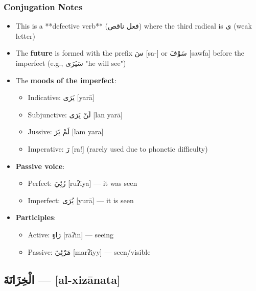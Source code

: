 \documentclass[letterpaper,12pt]{article}
\begin{document}
\subsubsection*{Conjugation Notes}
\begin{itemize}
  \item This is a **defective verb** (\textarabic{فعل ناقص}) where the third radical is \textarabic{ى} (weak letter)
  \item The \textbf{future} is formed with the prefix \textarabic{سَ} [sa-] or \textarabic{سَوْفَ} [sawfa] before the imperfect (e.g., \textarabic{سَيَرَى} "he will see")
  \item The \textbf{moods of the imperfect}: 
    \begin{itemize}
      \item Indicative: \textarabic{يَرَى} [yarā] 
      \item Subjunctive: \textarabic{لَنْ يَرَى} [lan yarā]
      \item Jussive: \textarabic{لَمْ يَرَ} [lam yara]
      \item Imperative: \textarabic{رَ} [ra!] (rarely used due to phonetic difficulty)
    \end{itemize}
  \item \textbf{Passive voice}: 
    \begin{itemize}
      \item Perfect: \textarabic{رُئِيَ} [ruʔiya] — it was seen
      \item Imperfect: \textarabic{يُرَى} [yurā] — it is seen
    \end{itemize}
  \item \textbf{Participles}:
    \begin{itemize}
      \item Active: \textarabic{رَاءٍ} [rāʔin] — seeing
      \item Passive: \textarabic{مَرْئِيّ} [marʔiyy] — seen/visible
    \end{itemize}
\end{itemize}
\subsection{\textarabic{الْخِزَانَةَ} — [al-xizānata]}
\end{document}

